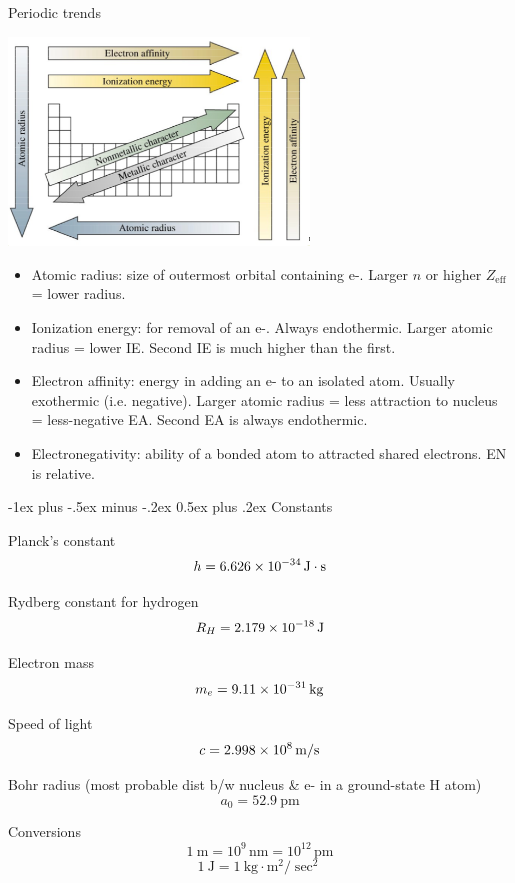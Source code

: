 \documentclass[10pt,landscape]{article}
\makeatletter
\renewcommand{\section}{\@startsection{section}{1}{0mm}%
                                {-1ex plus -.5ex minus -.2ex}%
                                {0.5ex plus .2ex}%
                                {\normalfont\large\bfseries}}
\makeatother
\begin{document}
\begin{multicols}{3}
Periodic trends

\begin{center}
\includegraphics[width=8cm]{./chm2311/periodic-table-trends.png}
\end{center}
 
\begin{itemize} 
\item Atomic radius: size of outermost orbital containing e-. Larger $n$ or higher $Z_\text{eff}$ = lower radius.
\item Ionization energy: for removal of an e-. Always endothermic. Larger atomic radius  = lower IE.  Second IE is much higher than the first.
\item Electron affinity: energy in adding an e- to an isolated atom. Usually exothermic (i.e. negative). Larger atomic radius = less attraction to nucleus = less-negative EA. Second EA is always endothermic. 
\item Electronegativity: ability of a bonded atom to attracted shared electrons. EN is relative.
\end{itemize}

\hrulefill


\section{Constants}

Planck's constant
\[ h = \SI{6.626E-34}{\joule\cdot\second} \]
 
 Rydberg constant for hydrogen
 \[ R_H =  \SI{2.179E-18}{\joule} \]
 
Electron mass
\[  m_e = \SI{9,11E-31}{\kilogram} \]

Speed of light
\[ c = \SI{2.998E8}{\meter/\second}  \]

Bohr radius \scriptsize{(most probable dist b/w nucleus \& e- in a ground-state H atom)}
\[ a_0 = \SI{52.9}{\pico\metre} \]

Conversions
\[ \SI{1}{\metre} = 10^9 \, \si{\nano\metre} = 10^{12} \, \si{\pico\metre}\]
\[ \SI{1}{\joule} = \SI{1}{\kilogram\cdot\metre^2/\sec^2}  \]



\end{multicols}
\end{document}
